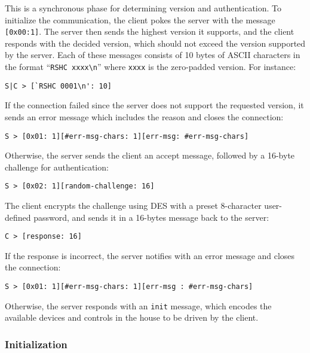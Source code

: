 This is a synchronous phase for determining version and authentication. To initialize the communication, the client pokes the server with the message {\tt [0x00:1]}. The server then sends the highest version it supports, and the client responds with the decided version, which should not exceed the version supported by the server. Each of these messages consists of 10 bytes of ASCII characters in the format ``{\tt RSHC xxxx\textbackslash n}'' where {\tt xxxx} is the zero-padded version. For instance:

\begin{verbatim}
S|C > [`RSHC 0001\n': 10]
\end{verbatim}

\noindent
If the connection failed since the server does not support the requested version, it sends an error message which includes the reason and closes the connection:

\begin{verbatim}
S > [0x01: 1][#err-msg-chars: 1][err-msg: #err-msg-chars]
\end{verbatim}

\noindent
Otherwise, the server sends the client an accept message, followed by a 16-byte challenge for authentication:

\begin{verbatim}
S > [0x02: 1][random-challenge: 16]
\end{verbatim}

\noindent
The client encrypts the challenge using DES with a preset 8-character user-defined password, and sends it in a 16-bytes message back to the server:

\begin{verbatim}
C > [response: 16]
\end{verbatim}

\noindent
If the response is incorrect, the server notifies with an error message and closes the connection:
\begin{verbatim}
S > [0x01: 1][#err-msg-chars: 1][err-msg : #err-msg-chars]
\end{verbatim}

\noindent
Otherwise, the server responds with an {\tt init} message, which encodes the available devices and controls in the house to be driven by the client.

\subsubsection{Initialization}
\label{sec:pdus:pdu:init}

